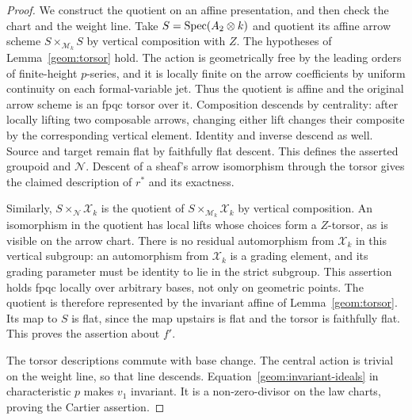 \begin{proof}
We construct the quotient on an affine presentation, and then check the
chart and the weight line.  Take $S=\operatorname{Spec}(A_2\otimes k)$ and quotient
its affine arrow scheme
$S\times_{\mathcal M_k}S$ by vertical composition with $Z$.
The hypotheses of Lemma~\ref{geom:torsor} hold.  The action is
geometrically free by the leading orders of finite-height $p$-series,
and it is locally finite on the arrow coefficients by uniform
continuity on each formal-variable jet.  Thus the quotient is affine
and the original arrow scheme is an fpqc torsor over it.
Composition descends by centrality: after locally lifting two
composable arrows, changing either lift changes their composite by
the corresponding vertical element.  Identity and inverse descend
as well.  Source and target remain flat by faithfully flat descent.
This defines the asserted groupoid and $\mathcal N$.
Descent of a sheaf's arrow isomorphism through the torsor gives the
claimed description of $r^*$ and its exactness.

Similarly, $S\times_{\mathcal N}\mathcal X_k$ is the quotient of
$S\times_{\mathcal M_k}\mathcal X_k$ by vertical composition.
An isomorphism in the quotient has local lifts whose choices form
a $Z$-torsor, as is visible on the arrow chart.  There is no residual
automorphism from $\mathcal X_k$ in this vertical subgroup: an
automorphism from $\mathcal X_k$ is a grading element, and its
grading parameter must be identity to lie in the strict subgroup.
This assertion holds fpqc locally over arbitrary bases, not only on
geometric points.  The quotient is therefore represented by the
invariant affine of Lemma~\ref{geom:torsor}.  Its map to $S$ is flat,
since the map upstairs is flat and the torsor is faithfully flat.
This proves the assertion about $f'$.

The torsor descriptions commute with base change.  The central
action is trivial on the weight line, so that line descends.
Equation~\eqref{geom:invariant-ideals} in characteristic $p$ makes
$v_1$ invariant.  It is a non-zero-divisor on the law charts, proving
the Cartier assertion.
\end{proof}

